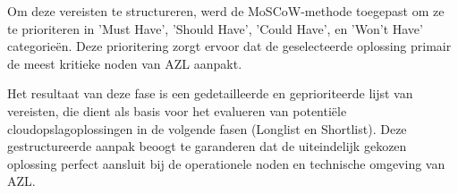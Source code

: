 Om deze vereisten te structureren, werd de MoSCoW-methode toegepast om ze te prioriteren in 'Must Have', 'Should Have', 'Could Have', en 'Won't Have' categorieën. Deze prioritering zorgt ervoor dat de geselecteerde oplossing primair de meest kritieke noden van AZL aanpakt.

Het resultaat van deze fase is een gedetailleerde en geprioriteerde lijst van vereisten, die dient als basis voor het evalueren van potentiële cloudopslagoplossingen in de volgende fasen (Longlist en Shortlist). Deze gestructureerde aanpak beoogt te garanderen dat de uiteindelijk gekozen oplossing perfect aansluit bij de operationele noden en technische omgeving van AZL.